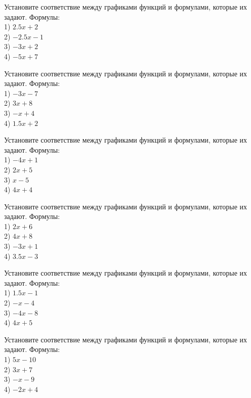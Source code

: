 \documentclass[4apaper]{article}
\begin{document}
\begin{taskBN}{13}
Установите соответствие между графиками функций и формулами, которые их задают. Формулы: \\1) $2.5x+2$\\2) $-2.5x-1$\\3) $-3x+2$\\4) $-5x+7$
\end{taskBN}

\begin{taskBN}{14}
Установите соответствие между графиками функций и формулами, которые их задают. Формулы: \\1) $-3x-7$\\2) $3x+8$\\3) $-x+4$\\4) $1.5x+2$
\end{taskBN}

\begin{taskBN}{15}
Установите соответствие между графиками функций и формулами, которые их задают. Формулы: \\1) $-4x+1$\\2) $2x+5$\\3) $x-5$\\4) $4x+4$
\end{taskBN}

\begin{taskBN}{16}
Установите соответствие между графиками функций и формулами, которые их задают. Формулы: \\1) $2x+6$\\2) $4x+8$\\3) $-3x+1$\\4) $3.5x-3$
\end{taskBN}

\begin{taskBN}{17}
Установите соответствие между графиками функций и формулами, которые их задают. Формулы: \\1) $1.5x-1$\\2) $-x-4$\\3) $-4x-8$\\4) $4x+5$
\end{taskBN}

\begin{taskBN}{18}
Установите соответствие между графиками функций и формулами, которые их задают. Формулы: \\1) $5x-10$\\2) $3x+7$\\3) $-x-9$\\4) $-2x+4$
\end{taskBN}
\end{document}
